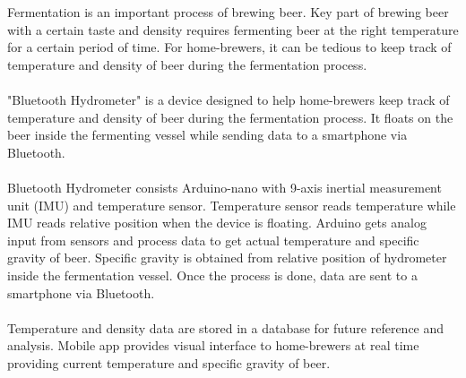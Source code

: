 Fermentation is an important process of brewing beer. Key part of brewing beer with a certain taste and density requires fermenting beer at the right temperature for a certain period of time. For home-brewers, it can be tedious to keep track of temperature and density of beer during the fermentation process.
\\\\
"Bluetooth Hydrometer" is a device designed to help home-brewers keep track of temperature and density of beer during the fermentation process. It floats on the beer inside the fermenting vessel while sending data to a smartphone via Bluetooth.
\\\\
Bluetooth Hydrometer consists Arduino-nano with 9-axis inertial measurement unit (IMU) and temperature sensor. Temperature sensor reads temperature while IMU reads relative position when the device is floating.  Arduino gets analog input from sensors and process data to get actual temperature and specific gravity of beer. Specific gravity is obtained from relative position of hydrometer inside the fermentation vessel. Once the process is done, data are sent to a smartphone via Bluetooth. 
\\\\
Temperature and density data are stored in a database for future reference and analysis. Mobile app provides visual interface to home-brewers at real time providing current temperature and specific gravity of beer. 